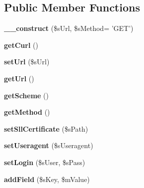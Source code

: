\subsection*{Public Member Functions}
\begin{DoxyCompactItemize}
\item 
\hypertarget{class_web_request_a3bf51472d82b1a95f3139a5bee520a1e}{{\bfseries \-\_\-\-\_\-construct} (\$s\-Url, \$s\-Method= 'G\-E\-T')}\label{class_web_request_a3bf51472d82b1a95f3139a5bee520a1e}

\item 
\hypertarget{class_web_request_a2eb8132d4cee4f5a2857f85b5191d0cd}{{\bfseries get\-Curl} ()}\label{class_web_request_a2eb8132d4cee4f5a2857f85b5191d0cd}

\item 
\hypertarget{class_web_request_a22ff38cd7a5caa65963fd32fd0fbded2}{{\bfseries set\-Url} (\$s\-Url)}\label{class_web_request_a22ff38cd7a5caa65963fd32fd0fbded2}

\item 
\hypertarget{class_web_request_a8408cfa5a856061253d535776eb9b3d2}{{\bfseries get\-Url} ()}\label{class_web_request_a8408cfa5a856061253d535776eb9b3d2}

\item 
\hypertarget{class_web_request_a29234bc724dbaf32d7f586219d0f6fab}{{\bfseries get\-Scheme} ()}\label{class_web_request_a29234bc724dbaf32d7f586219d0f6fab}

\item 
\hypertarget{class_web_request_a62d0b77ab586b36143f8f2af38b6e101}{{\bfseries get\-Method} ()}\label{class_web_request_a62d0b77ab586b36143f8f2af38b6e101}

\item 
\hypertarget{class_web_request_aeb1ce9ef04a3f7f234e4f92c35ed0cb5}{{\bfseries set\-Sll\-Certificate} (\$s\-Path)}\label{class_web_request_aeb1ce9ef04a3f7f234e4f92c35ed0cb5}

\item 
\hypertarget{class_web_request_abef3623b685a844a2a2dc50e66977d46}{{\bfseries set\-Useragent} (\$s\-Useragent)}\label{class_web_request_abef3623b685a844a2a2dc50e66977d46}

\item 
\hypertarget{class_web_request_a46889fb909bc43b24c2d8513713c9c64}{{\bfseries set\-Login} (\$s\-User, \$s\-Pass)}\label{class_web_request_a46889fb909bc43b24c2d8513713c9c64}

\item 
\hypertarget{class_web_request_a01d5e3e68b8b7ce654107bb1dabdcaa7}{{\bfseries add\-Field} (\$s\-Key, \$m\-Value)}\label{class_web_request_a01d5e3e68b8b7ce654107bb1dabdcaa7}


\end{DoxyCompactItemize}

